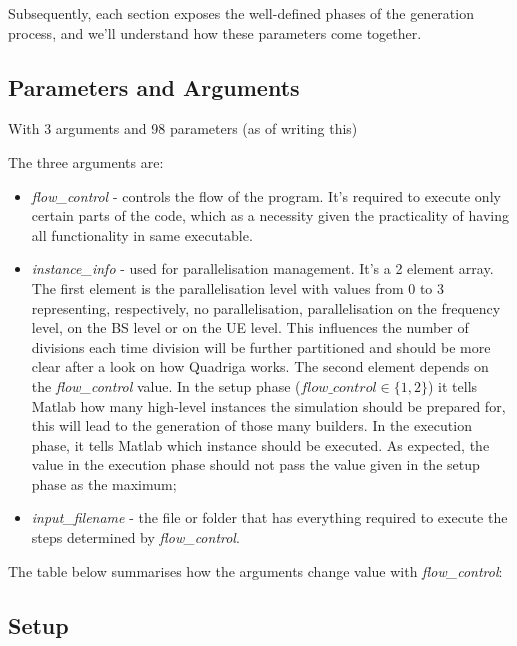 Subsequently, each section exposes the well-defined phases of the generation process, and we'll understand how these parameters come together.

\subsection{Parameters and Arguments}

With 3 arguments and 98 parameters (as of writing this)

The three arguments are:

\begin{itemize}
    \item \textit{flow\_control} - controls the flow of the program. It's required to execute only certain parts of the code, which as a necessity given the practicality of having all functionality in same executable. 
    \item \textit{instance\_info} - used for parallelisation management. It's a 2 element array. The first element is the parallelisation level with values from 0 to 3 representing, respectively, no parallelisation, parallelisation on the frequency level, on the \acl{BS} level or on the UE level. This influences the number of divisions each time division will be further partitioned and should be more clear after a look on how Quadriga works. The second element depends on the \textit{flow\_control} value. In the setup phase ($flow\_control \in \{1, 2\}$) it tells Matlab how many high-level instances the simulation should be prepared for, this will lead to the generation of those many builders. In the execution phase, it tells Matlab which instance should be executed. As expected, the value in the execution phase should not pass the value given in the setup phase as the maximum;
    \item \textit{input\_filename} - the file or folder that has everything required to execute the steps determined by \textit{flow\_control}.
\end{itemize}

The table below summarises how the arguments change value with \textit{flow\_control}:







\subsection{Setup}

